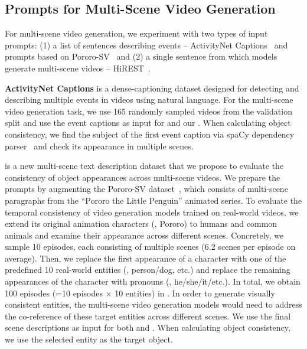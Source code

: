 \subsection{Prompts for Multi-Scene Video Generation}
\label{sec:multi_scene_evaluation_dataset_appendix}

For multi-scene video generation,
we experiment with two types of input prompts:
(1) a list of sentences describing events -- ActivityNet Captions~\citep{krishna2017dense} and
\corefdata{} prompts based on Pororo-SV~\citep{li2018storygan}
and
(2) a single sentence from which models generate multi-scene videos  -- HiREST~\citep{zala2023hierarchical}.


\textbf{ActivityNet Captions} is a dense-captioning dataset designed for detecting and describing multiple events in videos using natural language.
For the multi-scene video generation task,
we use 165 randomly sampled videos from the validation split
and use the event captions as input for \modelscope{} and our \method{}.
When calculating object consistency, we find the subject of the first event caption via spaCy dependency parser~\citep{spacy2} and check its appearance in multiple scenes.


\textbf{\corefdata{}}
is a new multi-scene text description dataset
that we propose to 
evaluate the consistency of object appearances across multi-scene videos.
We prepare the \corefdata{} prompts by augmenting the Pororo-SV dataset~\citep{li2018storygan,PororoQA2017Kim},
which consists of multi-scene paragraphs from the ``Pororo the Little Penguin'' animated series.
To evaluate the temporal consistency of video generation models trained on real-world videos, we extend its original animation characters (\eg{}, Pororo) to humans and common 
animals and examine their appearance across different scenes.
Concretely, we sample 10 episodes, each consisting of multiple scenes (6.2 scenes per episode on average).
Then, we replace the first appearance of a character with one of the predefined 10 real-world entities (\eg{}, person/dog, etc.) and replace the remaining appearances of the character with pronouns (\eg{}, he/she/it/etc.).
In total, we obtain 100 episodes (=10 episodes $\times$ 10 entities) in \corefdata{}.
In order to generate visually consistent entities,
the multi-scene video generation models would need to address the co-reference of these target entities across different scenes.
We use the final scene descriptions as input for both \modelscope{} and \method{}. When calculating object consistency, we use the selected 
entity as the target object.


